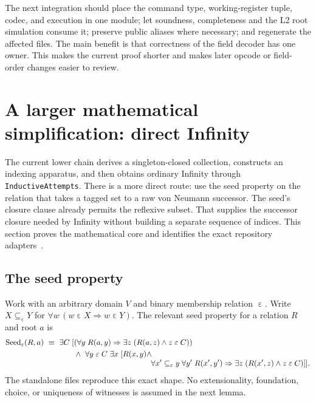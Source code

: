 \documentclass[11pt,letterpaper]{article}
\theoremstyle{definition}\newtheorem{definition}[theorem]{Definition}
\newcommand{\Seed}{\operatorname{Seed}}
\newcommand{\mem}{\mathrel{\varepsilon}}
\newcommand{\code}[1]{\texttt{#1}}
\begin{document}
The next integration should place the command type, working-register tuple,
codec, and execution in one module; let soundness, completeness and the L2 root
simulation consume it; preserve public aliases where necessary; and regenerate
the affected files. The main benefit is that correctness of the field decoder
has one owner. This makes the current proof shorter and makes later opcode or
field-order changes easier to review.

\section{A larger mathematical simplification: direct Infinity}

The current lower chain derives a singleton-closed collection, constructs an
indexing apparatus, and then obtains ordinary Infinity through
\code{InductiveAttempts}. There is a more direct route: use the seed property on
the relation that takes a tagged set to a raw von Neumann successor. The seed's
closure clause already permits the reflexive subset. That supplies the successor
closure needed by Infinity without building a separate sequence of indices.
This section proves the mathematical core and identifies the exact repository
adapters~\cite{seed,lower,attempts}.

\subsection{The seed property}

Work with an arbitrary domain $V$ and binary membership relation $\mem$. Write
$X\subseteq_{\mem}Y$ for $\forall w\,(w\mem X\Rightarrow w\mem Y)$. The relevant
seed property for a relation $R$ and root $a$ is
\begin{align*}
\Seed_{\mem}(R,a)\ \equiv\ \exists C\;[&
 (\forall y\;R(a,y)\Rightarrow\exists z\;(R(a,z)\land z\mem C))\\
 &\land\ \forall y\mem C\;\exists x\;[R(x,y)\land\\[-3pt]
 &\hspace{35mm}\forall x'\subseteq_{\mem}y\;\forall y'\;
       R(x',y')\Rightarrow\exists z\;(R(x',z)\land z\mem C)]] .
\end{align*}
The standalone files reproduce this exact shape. No extensionality, foundation,
choice, or uniqueness of witnesses is assumed in the next lemma.
\end{document}

